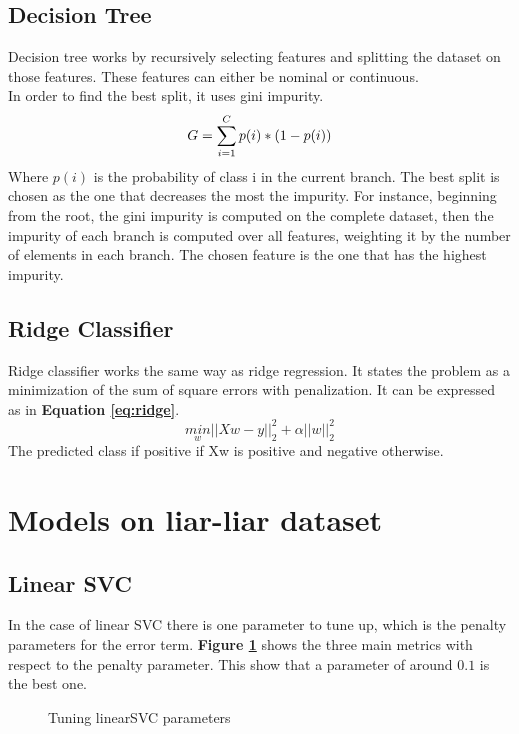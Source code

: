 \subsection{Decision Tree\cite{Rokach:2014:DMD:2755359}}
Decision tree works by recursively selecting features and splitting the dataset on those features. These features can either be nominal or continuous. \\
In order to find the best split, it uses gini impurity. 
\begin{equation}
 G = \sum_{i=1}^C p(i) * (1-p(i))\\
\end{equation}
Where $p(i)$ is the probability of class i in the current branch. The best split is chosen as the one that decreases the most the impurity. For instance, beginning from the root, the gini impurity is computed on the complete dataset, then the impurity of each branch is computed over all features, weighting it by the number of elements in each branch. The chosen feature is the one that has the highest impurity. 
\subsection{Ridge Classifier}
Ridge classifier works the same way as ridge regression. It states the problem as a minimization of the sum of square errors with penalization. It can be expressed as in \textbf{Equation \ref{eq:ridge}}.
\begin{equation}
 \underset{w}{min} ||Xw-y||^2_2 + \alpha ||w||^2_2 \label{eq:ridge}
\end{equation}
The predicted class if positive if Xw is positive and negative otherwise. 
\section{Models on liar-liar dataset}
\subsection{Linear SVC}
In the case of linear SVC there is one parameter to tune up, which is the penalty parameters for the error term. \textbf{Figure \ref{fig:chap3:linearSVC}} shows the three main metrics with respect to the penalty parameter. This show that a parameter of around $0.1$ is the best one. 
\begin{figure}[]
 \centering
 \caption{Tuning linearSVC parameters }
 \label{fig:chap3:linearSVC}
\end{figure}
